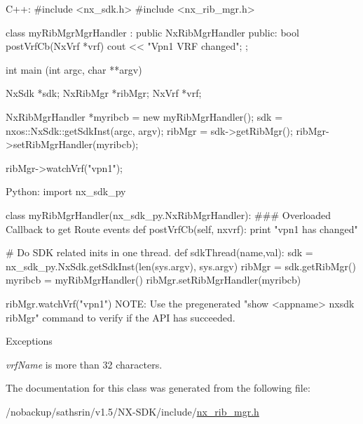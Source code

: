 \begin{DoxyCode}
  C++:
       #include <nx_sdk.h>
       #include <nx_rib_mgr.h>

       class myRibMgrMgrHandler : public NxRibMgrHandler {
          public:
             bool postVrfCb(NxVrf *vrf) {
                  cout << "Vpn1 VRF changed";
             }
       };

       int  main (int argc, char **argv)
       { 
            NxSdk    *sdk;
            NxRibMgr *ribMgr;
            NxVrf    *vrf;

            NxRibMgrHandler *myribcb = new myRibMgrHandler();
            sdk = nxos::NxSdk::getSdkInst(argc, argv);
            ribMgr = sdk->getRibMgr();
            ribMgr->setRibMgrHandler(myribcb);

            ribMgr->watchVrf("vpn1");
       }

  Python:
     import nx_sdk_py

     class myRibMgrHandler(nx_sdk_py.NxRibMgrHandler):
     ### Overloaded Callback to get Route events
           def postVrfCb(self, nxvrf):
               print "vpn1 has changed"

     # Do SDK related inits in one thread.
     def sdkThread(name,val):
         sdk = nx_sdk_py.NxSdk.getSdkInst(len(sys.argv), sys.argv)
         ribMgr = sdk.getRibMgr()
         myribcb = myRibMgrHandler()
         ribMgr.setRibMgrHandler(myribcb)

         ribMgr.watchVrf("vpn1")
 NOTE: Use the pregenerated "show <appname> nxsdk ribMgr" command
       to verify if the API has succeeded.
\end{DoxyCode}



\begin{DoxyExceptions}{Exceptions}
\item[{\em vrfName}]is more than 32 characters. \end{DoxyExceptions}


The documentation for this class was generated from the following file:\begin{DoxyCompactItemize}
\item 
/nobackup/sathsrin/v1.5/NX-\/SDK/include/\hyperlink{nx__rib__mgr_8h}{nx\_\-rib\_\-mgr.h}\end{DoxyCompactItemize}
